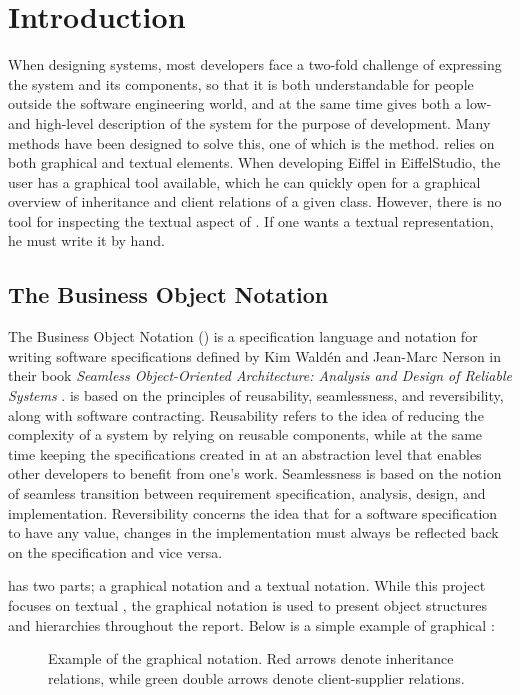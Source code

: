 \chapter{Introduction}
\label{sec:introduction}
When designing systems, most developers face a two-fold challenge of expressing the system and its components, so that it is both understandable for people outside the software engineering world, and at the same time gives both a low- and high-level description of the system for the purpose of development. Many methods have been designed to solve this, one of which is the \bon{} method. \bon{} relies on both graphical and textual elements. When developing Eiffel in EiffelStudio, the user has a graphical \bon{} tool available, which he can quickly open for a graphical overview of inheritance and client relations of a given class. However, there is no tool for inspecting the textual aspect of \bon. If one wants a textual representation, he must write it by hand.

\section{The Business Object Notation}
The Business Object Notation (\bon{}) is a specification language and notation for writing software specifications defined by Kim Wald\'en and Jean-Marc Nerson in their book \textit{Seamless Object-Oriented Architecture: Analysis and Design of Reliable Systems} \cite{walden1995}. \bon{} is based on the principles of reusability, seamlessness, and reversibility, along with software contracting. Reusability refers to the idea of reducing the complexity of a system by relying on reusable components, while at the same time keeping the specifications created in \bon{} at an abstraction level that enables other developers to benefit from one's work. Seamlessness is based on the notion of seamless transition between requirement specification, analysis, design, and implementation. Reversibility concerns the idea that for a software specification to have any value, changes in the implementation must always be reflected back on the specification and vice versa.

\bon{} has two parts; a graphical notation and a textual notation. While this project focuses on textual \bon{}, the graphical notation is used to present object structures and hierarchies throughout the report. Below is a simple example of graphical \bon{}:

\begin{figure}[H]
    \centerline{}
    \caption[Example of the graphical \bon{} notation]{Example of the graphical \bon{} notation. Red arrows denote inheritance relations, while green double arrows denote client-supplier relations.}
    \label{fig:context-classes}
\end{figure}

